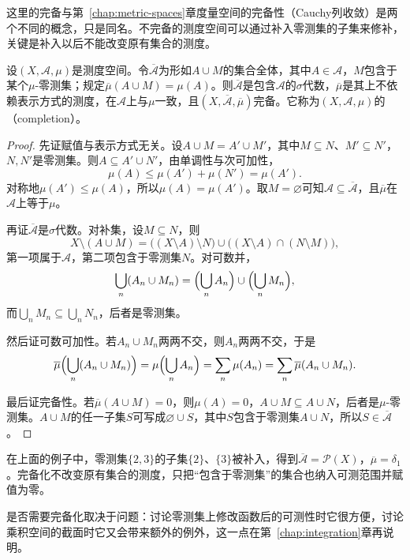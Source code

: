 这里的完备与第~\ref{chap:metric-spaces}章度量空间的完备性（Cauchy列收敛）是两个不同的概念，只是同名。不完备的测度空间可以通过补入零测集的子集来修补，关键是补入以后不能改变原有集合的测度。

\begin{theorem}[测度空间的完备化]
\label{thm:meas-completion}
设$(X,\mathcal A,\mu)$是测度空间。令$\overline{\mathcal A}$为形如$A\cup M$的集合全体，其中$A\in\mathcal A$，$M$包含于某个$\mu$-零测集；规定$\overline\mu(A\cup M)=\mu(A)$。则$\overline{\mathcal A}$是包含$\mathcal A$的$\sigma$代数，$\overline\mu$是其上不依赖表示方式的测度，在$\mathcal A$上与$\mu$一致，且$(X,\overline{\mathcal A},\overline\mu)$完备。它称为$(X,\mathcal A,\mu)$的（completion）。
\end{theorem}

\begin{proof}
先证赋值与表示方式无关。设$A\cup M=A'\cup M'$，其中$M\subseteq N$、$M'\subseteq N'$，$N,N'$是零测集。则$A\subseteq A'\cup N'$，由单调性与次可加性，
\[
 \mu(A)\leq\mu(A')+\mu(N')=\mu(A').
\]
对称地$\mu(A')\leq\mu(A)$，所以$\mu(A)=\mu(A')$。取$M=\varnothing$可知$\mathcal A\subseteq\overline{\mathcal A}$，且$\overline\mu$在$\mathcal A$上等于$\mu$。

再证$\overline{\mathcal A}$是$\sigma$代数。对补集，设$M\subseteq N$，则
\[
 X\setminus(A\cup M)=\bigl((X\setminus A)\setminus N\bigr)\cup\bigl((X\setminus A)\cap(N\setminus M)\bigr),
\]
第一项属于$\mathcal A$，第二项包含于零测集$N$。对可数并，
\[
 \bigcup_n(A_n\cup M_n)=\Bigl(\bigcup_nA_n\Bigr)\cup\Bigl(\bigcup_nM_n\Bigr),
\]
而$\bigcup_nM_n\subseteq\bigcup_nN_n$，后者是零测集。

然后证可数可加性。若$A_n\cup M_n$两两不交，则$A_n$两两不交，于是
\[
 \overline\mu\Bigl(\bigcup_n(A_n\cup M_n)\Bigr)=\mu\Bigl(\bigcup_nA_n\Bigr)
 =\sum_n\mu(A_n)=\sum_n\overline\mu(A_n\cup M_n).
\]

最后证完备性。若$\overline\mu(A\cup M)=0$，则$\mu(A)=0$，$A\cup M\subseteq A\cup N$，后者是$\mu$-零测集。$A\cup M$的任一子集$S$可写成$\varnothing\cup S$，其中$S$包含于零测集$A\cup N$，所以$S\in\overline{\mathcal A}$。
\end{proof}

在上面的例子中，零测集$\{2,3\}$的子集$\{2\}$、$\{3\}$被补入，得到$\overline{\mathcal A}=\mathcal P(X)$，$\overline\mu=\delta_1$。完备化不改变原有集合的测度，只把“包含于零测集”的集合也纳入可测范围并赋值为零。

是否需要完备化取决于问题：讨论零测集上修改函数后的可测性时它很方便，讨论乘积空间的截面时它又会带来额外的例外，这一点在第~\ref{chap:integration}章再说明。
